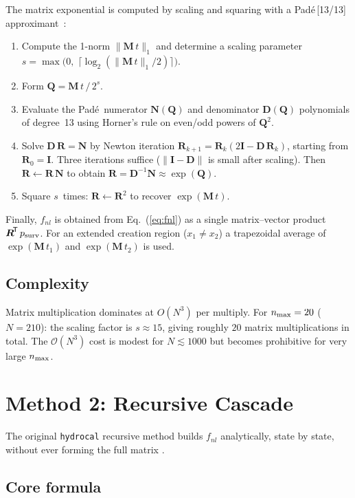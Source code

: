 \documentclass[11pt,a4paper]{article}
\newcommand{\bD}{\boldsymbol{D}}
\newcommand{\bI}{\boldsymbol{I}}
\newcommand{\bM}{\boldsymbol{M}}
\newcommand{\bN}{\boldsymbol{N}}
\newcommand{\bQ}{\boldsymbol{Q}}
\newcommand{\bR}{\boldsymbol{R}}
\begin{document}
The matrix exponential is computed by scaling and squaring with a
Pad\'{e}\,[13/13] approximant~\cite{Higham2008}:
\begin{enumerate}
\item Compute the 1-norm $\|\bM\,t\|_1$ and determine a scaling
  parameter $s = \max\bigl(0,\;\lceil\log_2(\|\bM\,t\|_1/2)\rceil\bigr)$.
\item Form $\bQ = \bM\,t\,/\,2^s$.
\item Evaluate the Pad\'{e}\ numerator $\bN(\bQ)$ and denominator
  $\bD(\bQ)$ polynomials of degree~13 using Horner's rule on even/odd
  powers of $\bQ^2$.
\item Solve $\bD\,\bR = \bN$ by Newton iteration
  $\bR_{k+1} = \bR_k(2\bI - \bD\,\bR_k)$, starting from $\bR_0 = \bI$.
  Three iterations suffice ($\|\bI - \bD\|$ is small after scaling).
  Then $\bR \leftarrow \bR\,\bN$ to obtain $\bR = \bD^{-1}\bN \approx \exp(\bQ)$.
\item Square $s$~times: $\bR \leftarrow \bR^2$ to recover
  $\exp(\bM\,t)$.
\end{enumerate}
Finally, $f_{nl}$ is obtained from Eq.~(\ref{eq:fnl}) as a single
matrix--vector product $\bR^{\!\mathsf T}\,p_{\rm surv}$.
For an extended creation region ($x_1 \ne x_2$) a trapezoidal average
of $\exp(\bM\,t_1)$ and $\exp(\bM\,t_2)$ is used.

\subsection{Complexity}

Matrix multiplication dominates at $O(N^3)$ per multiply.
For $n_{\rm max} = 20$ ($N = 210$): the scaling factor is
$s \approx 15$, giving roughly $20$ matrix multiplications in total.
The $\mathcal{O}(N^3)$ cost is modest for $N \lesssim 1000$ but becomes
prohibitive for very large $n_{\rm max}$.

\section{Method 2: Recursive Cascade}

The original \texttt{hydrocal} recursive method builds $f_{nl}$ analytically, state by state,
without ever forming the full matrix \cite{Schippers2001c}.

\subsection{Core formula}
\end{document}
